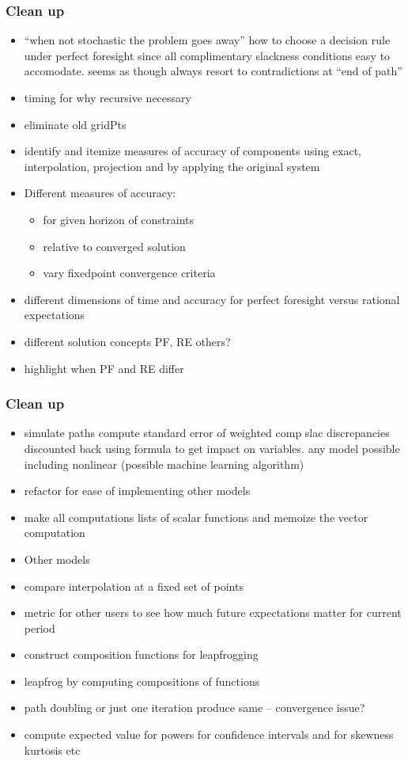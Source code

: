\documentclass{beamer}
\begin{document}
   \begin{frame}
     \frametitle{Clean up}
     \begin{itemize}
     \item ``when not stochastic the problem goes away''  how to choose a decision rule under perfect foresight since all complimentary slackness conditions easy to accomodate. seems as though always resort to contradictions at ``end of path''
     \item timing for why recursive necessary
       \item eliminate old gridPts
\item identify and itemize measures of accuracy of components using exact, interpolation, projection and by applying the original system
\item Different measures of accuracy: 
  \begin{itemize}
  \item for given horizon of constraints
  \item relative to converged solution
  \item vary fixedpoint convergence criteria
  \end{itemize}
\item different dimensions of time and accuracy for perfect foresight versus rational expectations
\item different solution concepts PF, RE others?
     \item highlight when PF and RE differ
     \end{itemize}
   \end{frame}
   \begin{frame}
     \frametitle{Clean up}
     \begin{itemize}
     \item simulate paths compute standard error of weighted comp slac discrepancies discounted back using formula to get impact on variables.  any model possible including nonlinear  (possible machine learning algorithm)
\item refactor for ease of implementing other models
\item make all computations lists of scalar functions and memoize the vector computation
\item Other models
\item compare interpolation at a fixed set of points
\item metric for other users to see how much future expectations matter for current period
\item construct composition functions for leapfrogging
\item leapfrog by computing compositions of functions
     \item path doubling or just one iteration produce same  -- convergence  issue?
\item compute expected value for powers for confidence intervals and for skewness kurtosis etc
     \end{itemize}
   \end{frame}
\end{document}

